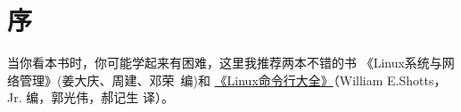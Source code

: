 \chapter{序}

当你看本书时，你可能学起来有困难，这里我推荐两本不错的书 《Linux系统与网络管理》(姜大庆、周建、邓荣~编)和 
\href{https://item.jd.com/11196146.html}{《Linux命令行大全》}（William E.Shotts，Jr. 编，郭光伟，郝记生 译）。
